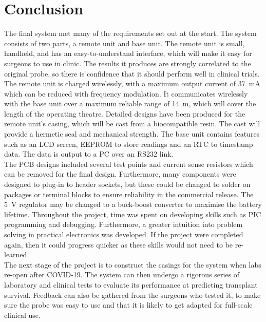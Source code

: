 \section{Conclusion}
The final system met many of the requirements set out at the start. The system consists of two parts, a remote unit and base unit. The remote unit is small, handheld, and has an easy-to-understand interface, which will make it easy for surgeons to use in clinic. The results it produces are strongly correlated to the original probe, so there is confidence that it should perform well in clinical trials. The remote unit is charged wirelessly, with a maximum output current of \SI{37}{\milli\ampere} which can be reduced with frequency modulation. It communicates wirelessly with the base unit over a maximum reliable range of \SI{14}{\metre}, which will cover the length of the operating theatre. Detailed designs have been produced for the remote unit's casing, which will be cast from a biocompatible resin. The cast will provide a hermetic seal and mechanical strength. The base unit contains features such as an LCD screen, EEPROM to store readings and an RTC to timestamp data. The data is output to a PC over an RS232 link.\\

The PCB designs included several test points and current sense resistors which can be removed for the final design. Furthermore, many components were designed to plug-in to header sockets, but these could be changed to solder on packages or terminal blocks to ensure reliability in the commercial release. The \SI{5}{\volt} regulator may be changed to a buck-boost converter to maximise the battery lifetime. Throughout the project, time was spent on developing skills such as PIC programming and debugging. Furthermore, a greater intuition into problem solving in practical electronics was developed. If the project were completed again, then it could progress quicker as these skills would not need to be re-learned. \\

The next stage of the project is to construct the casings for the system when labs re-open after COVID-19. The system can then undergo a rigorous series of laboratory and clinical tests to evaluate its performance at predicting transplant survival. Feedback can also be gathered from the surgeons who tested it, to make sure the probe was easy to use and that it is likely to get adapted for full-scale clinical use.